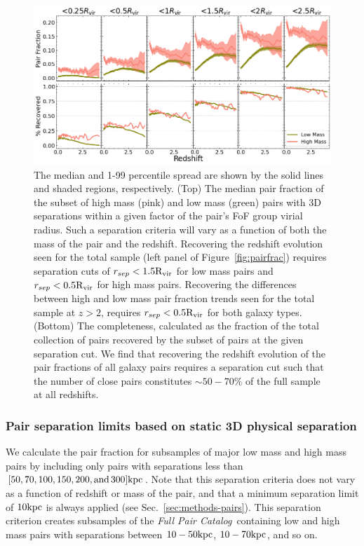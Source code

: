 \documentclass[twocolumn]{aastex631}
\newcommand{\paircat}{\textit{Full Pair Catalog}}
\newcommand{\Rvir}{\ensuremath{\rm R_{vir}}}
\begin{document}
    \begin{figure}[htp]
        \centering
        \includegraphics[width=\textwidth]{pairfrac_vircut.png}
        \caption{\label{fig:vircut}The median and 1-99 percentile spread are shown by the solid lines and shaded regions, respectively. 
        (Top) The median pair fraction of the subset of high mass (pink) and low mass (green) pairs with 3D separations within a given factor of the pair's FoF group virial radius.
        Such a separation criteria will vary as a function of both the mass of the pair and the redshift. 
        Recovering the redshift evolution seen for the total sample (left panel of Figure~\ref{fig:pairfrac}) requires separation cuts of $r_{sep} < 1.5\Rvir$ for low mass pairs and $r_{sep} < 0.5\Rvir$ for high mass pairs. 
        Recovering the differences between high and low mass pair fraction trends seen for the total sample at $z>2$, requires $r_{sep} < 0.5\Rvir$ for both galaxy types. 
        (Bottom) The completeness, calculated as the fraction of the total collection of pairs recovered by the subset of pairs at the given separation cut. 
        We find that recovering the redshift evolution of the pair fractions of all galaxy pairs requires a separation cut such that the number of close pairs constitutes $\sim50-70\%$ of the full sample at all redshifts.
    }
    \end{figure}

\subsubsection{Pair separation limits based on static 3D physical separation} \label{sec:results-frac-sepcut}
    We calculate the pair fraction for subsamples of major low mass and high mass pairs by including only pairs with separations less than $[50,70,100,150,200,\mathrm{and\, }300]\mathrm{kpc}$.  
    Note that this separation criteria does not vary as a function of redshift or mass of the pair, and that a minimum separation limit of $10\mathrm{kpc}$ is always applied (see Sec.~\ref{sec:methods-pairs}).
    This separation criterion creates subsamples of the \paircat\ containing low and high mass pairs with separations between $10-50\mathrm{kpc}$, $10-70\mathrm{kpc}$, and so on. 
\end{document}

